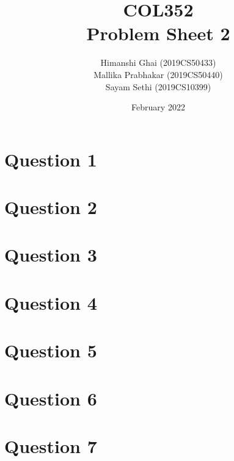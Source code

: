 \documentclass[11pt]{article}
\title{COL352\\Problem Sheet 2}
\author{Himanshi Ghai (2019CS50433)\\Mallika Prabhakar (2019CS50440)\\Sayam Sethi (2019CS10399)}
\date{February 2022}
\begin{document}
\maketitle

\tableofcontents


\newpage
\section{Question 1}



\newpage
\section{Question 2}



\newpage
\section{Question 3}



\newpage
\section{Question 4}



\newpage
\section{Question 5}



\newpage
\section{Question 6}



\newpage
\section{Question 7}


\end{document}
